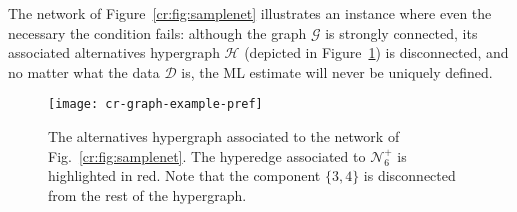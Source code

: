 The network of Figure~\ref{cr:fig:samplenet} illustrates an instance where even the necessary the condition fails:
although the graph $\mathcal{G}$ is strongly connected, its associated alternatives hypergraph $\mathcal{H}$ (depicted in Figure~\ref{cr:fig:samplehyp}) is disconnected, and no matter what the data $\mathcal{D}$ is, the ML estimate will never be uniquely defined.

\begin{figure}
  \centering
  \texttt{[image: cr-graph-example-pref]}
  \caption{The alternatives hypergraph associated to the network of Fig.~\ref{cr:fig:samplenet}.
The hyperedge associated to $\mathcal{N}^+_6$ is highlighted in red.
Note that the component $\{3, 4\}$ is disconnected from the rest of the hypergraph.}
  \label{cr:fig:samplehyp}
\end{figure}
